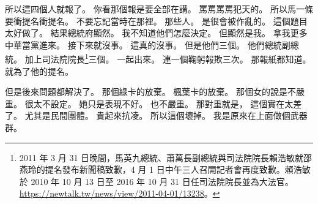 \hypertarget{c01:cue:3384}{}所以這四個人就報了。
\hypertarget{c01:cue:3385}{}你看那個報是要全部在講。
\hypertarget{c01:cue:3386}{}罵罵罵罵犯天的。
\hypertarget{c01:cue:3387}{}所以馬一條要衝提名衝提名。
\hypertarget{c01:cue:3388}{}不要忘記當時在那裡。
\hypertarget{c01:cue:3389}{}那些人。
\hypertarget{c01:cue:3390}{}是很會被作亂的。
\hypertarget{c01:cue:3391}{}這個題目太好做了。
\hypertarget{c01:cue:3392}{}結果總統府顯然。
\hypertarget{c01:cue:3393}{}我不知道他們怎麼決定。
\hypertarget{c01:cue:3394}{}但顯然是我。
\hypertarget{c01:cue:3395}{}拿我更多中華當黨進來。
\hypertarget{c01:cue:3396}{}接下來就沒事。
\hypertarget{c01:cue:3397}{}這真的沒事。
\hypertarget{c01:cue:3398}{}但是他們三個。
\hypertarget{c01:cue:3399}{}他們總統副總統。
\hypertarget{c01:cue:3400}{}加上司法院院長\footnote{2011 年 3 月 31 日晚間，馬英九總統、蕭萬長副總統與司法院院長賴浩敏就邵燕玲的提名發布新聞稿致歉，4 月 1 日中午三人召開記者會再度致歉。賴浩敏於 2010 年 10 月 13 日至 2016 年 10 月 31 日任司法院院長並為大法官。\url{https://newtalk.tw/news/view/2011-04-01/13238}。}三個。
\hypertarget{c01:cue:3401}{}一起出來。
\hypertarget{c01:cue:3402}{}連一個鞠躬報欺三次。
\hypertarget{c01:cue:3403}{}那報紙都知道。
\hypertarget{c01:cue:3404}{}就為了他的提名。

\hypertarget{c01:cue:3405}{}但是後來問題都解決了。
\hypertarget{c01:cue:3406}{}那個綠卡的放棄。
\hypertarget{c01:cue:3407}{}楓葉卡的放棄。
\hypertarget{c01:cue:3408}{}那個女的說是不嚴重。
\hypertarget{c01:cue:3409}{}很太不設定。
\hypertarget{c01:cue:3410}{}她只是表現不好。
\hypertarget{c01:cue:3411}{}也不嚴重。
\hypertarget{c01:cue:3412}{}那對重就是，
\hypertarget{c01:cue:3413}{}這個實在太差了。
\hypertarget{c01:cue:3414}{}尤其是民間團體。
\hypertarget{c01:cue:3415}{}貴起來抗凌。
\hypertarget{c01:cue:3416}{}所以這個壞掉。
\hypertarget{c01:cue:3417}{}我是原來在上面做個武器群。

